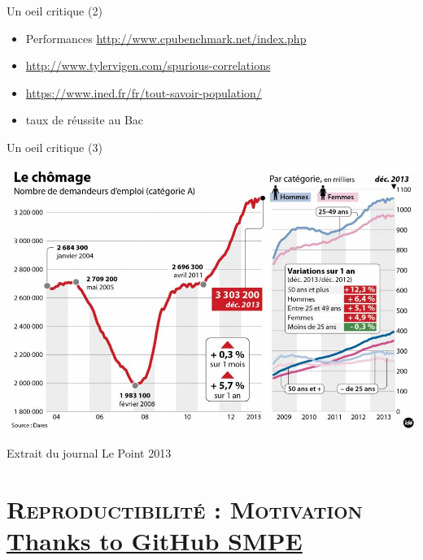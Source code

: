 \documentclass[xcolor=x11names,compress,8pt]{beamer}
\renewcommand{\(}{\begin{columns}}
\renewcommand{\)}{\end{columns}}
\newcommand{\<}[1]{\begin{column}{#1}}
\renewcommand{\>}{\end{column}}
\begin{document}
\begin{frame}{Un oeil critique (2)}
\begin{itemize}
\item Performances \url{http://www.cpubenchmark.net/index.php}
\item \url{http://www.tylervigen.com/spurious-correlations}
\item \url{https://www.ined.fr/fr/tout-savoir-population/}
\item taux de réussite au Bac
\end{itemize}
\end{frame}
\begin{frame}{Un oeil critique (3)}
\begin{center}
\includegraphics[width=0.8\linewidth]{2380774-ide-chomage-dec-2013-jpg_2048700.jpg}

Extrait du journal Le Point 2013
\end{center}
\end{frame}

\section[{\scshape Reproductibilité}]{{\scshape Reproductibilité : Motivation}  \href{https://github.com/alegrand/SMPE}{Thanks to GitHub SMPE} }
\end{document}
